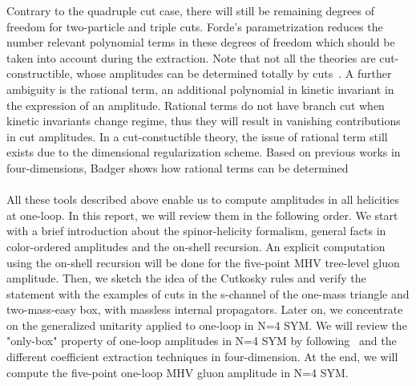 Contrary to the quadruple cut case, there will still be remaining degrees of freedom for two-particle and triple cuts. 
Forde's parametrization reduces the number relevant polynomial terms in these degrees of freedom which should be taken into account during the extraction. 
Note that not all the theories are cut-constructible, \ie whose amplitudes can be determined totally by cuts~\cite{Bern:1994cg}. 
A further ambiguity is the rational term, \ie an additional polynomial in kinetic invariant in the expression of an amplitude. 
Rational terms do not have branch cut when kinetic invariants change regime, thus they will result in vanishing contributions in cut amplitudes.
In a cut-constuctible theory, the issue of rational term still exists due to the dimensional regularization scheme. 
Based on previous works in four-dimensions, Badger shows how rational terms can be determined~\cite{Badger:2008cm}
\\\\
All these tools described above enable us to compute amplitudes in all helicities at one-loop.
In this report, we will review them in the following order.
We start with a brief introduction about the spinor-helicity formalism, general facts in color-ordered amplitudes and the on-shell recursion.
An explicit computation using the on-shell recursion will be done for the five-point MHV tree-level gluon amplitude. 
Then, we sketch the idea of the Cutkosky rules and verify the statement with the examples of cuts in the s-channel of the one-mass triangle and two-mass-easy box, with massless internal propagators.
Later on, we concentrate on the generalized unitarity applied to one-loop in N=4 SYM.
We will review the "only-box" property of one-loop amplitudes in N=4 SYM by following~\cite{Bern:1994zx} and the different coefficient extraction techniques in four-dimension. 
At the end, we will compute the five-point one-loop MHV gluon amplitude in N=4 SYM.











